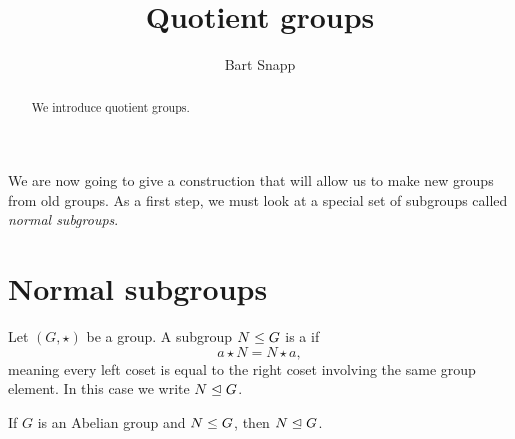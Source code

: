 \documentclass{ximera}
\author{Bart Snapp}
\title{Quotient groups}
\begin{document}
\begin{abstract}
  We introduce quotient groups.
\end{abstract}
\maketitle



We are now going to give a construction that will allow us to make new
groups from old groups. As a first step, we must look at a special set
of subgroups called \textit{normal subgroups}.




\section{Normal subgroups}




\begin{definition}
  Let $(G,\star)$ be a group. A subgroup $N\leq G$ is a 
  if
  \[
  a\star N = N\star a,
  \]
  meaning every left coset is equal to the right coset involving the
  same group element. In this case we write $N\trianglelefteq G$. 
\end{definition}

\begin{corollary}
  If $G$ is an Abelian group and $N\leq G$, then $N\trianglelefteq G$.
\end{corollary}
\end{document}
